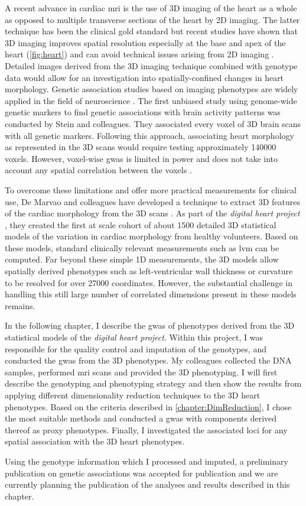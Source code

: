A recent advance in cardiac \gls{mri} is the use of 3D imaging of the heart as a whole as opposed to multiple transverse sections of the heart by 2D imaging. The latter technique has been the clinical gold standard but recent studies have shown that 3D imaging improves spatial resolution especially at the base and apex of the heart (\cref{fig:heart}) and can avoid technical issues arising from 2D imaging \citep{deMarvao2014}. Detailed images derived from the 3D imaging technique combined with genotype data would allow for an investigation into spatially-confined changes in heart morphology. Genetic association studies based on imaging phenotypes are widely applied in the field of neuroscience \citep{Filippini2009,Ho2010,Jahanshad2013,Hibar2015}. The first unbiased study using genome-wide genetic markers to find genetic associations with brain activity patterns was conducted by Stein and colleagues. They associated every voxel of 3D brain scans with all genetic markers. Following this approach, associating heart morphology as represented in the 3D scans would require testing approximately \num{140000} voxels. However, voxel-wise \gls{gwas} is limited in power and does not take into account any spatial correlation between the voxels \citep{Ge2014}. 

To overcome these limitations and offer more practical measurements for clinical use, De Marvao and colleagues have developed a technique to extract 3D features of the cardiac morphology from the 3D scans \citep{deMarvao2014}. As part of the \textit{digital heart project} \citep{Cook2010}, they created the first at scale cohort of about \num{1500} detailed 3D statistical models of the variation in cardiac morphology from healthy volunteers. Based on these models, standard clinically relevant measurements such as \gls{lvm} can be computed. Far beyond these simple 1D measurements, the 3D models allow spatially derived phenotypes such as left-ventricular wall thickness or curvature to be resolved for over \num{27000} coordinates. However, the substantial challenge in handling this still large number of correlated dimensions present in these models remains.

In the following chapter, I describe the \gls{gwas} of phenotypes derived from the 3D statistical models of the \textit{digital heart project}. Within this project, I was responsible for the quality control and imputation of the genotypes, and conducted the \gls{gwas} from the 3D phenotypes. My colleagues collected the DNA samples, performed \gls{mri} scans and provided the 3D phenotyping. I will first describe the genotyping and phenotyping strategy and then show the results from applying different dimensionality reduction techniques to the 3D heart phenotypes. Based on the criteria described in \cref{chapter:DimReduction}, I chose the most suitable methods and conducted a \gls{gwas} with components derived thereof as proxy phenotypes. Finally, I investigated the associated loci for any spatial association with the 3D heart phenotypes.

Using the genotype information which I processed and imputed, a preliminary publication on genetic associations was accepted for publication \citep{Biffi2017} and we are currently planning the publication of the analyses and results described in this chapter.


